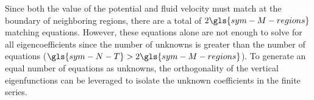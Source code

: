 \documentclass[ASNA,twocolumn]{USG} %
\begin{document}
\label{jfm:appB}
Since both the value of the potential and fluid velocity must match at the boundary of neighboring regions, there are a total of $2\gls{sym-M-regions}$ matching equations.
However, these equations alone are not enough to solve for all eigencoefficients since the number of unknowns is greater than the number of equations ($\gls{sym-N-T} >2\gls{sym-M-regions}$).
To generate an equal number of equations as unknowns, the orthogonality of the vertical eigenfunctions can be leveraged to isolate the unknown coefficients in the finite series. 



\end{document}
